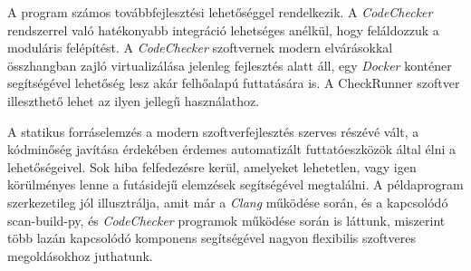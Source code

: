 \documentclass[a4paper,12pt]{report}
\begin{document}
A program számos továbbfejlesztési lehetőséggel rendelkezik. A \emph{CodeChecker} rendszerrel való hatékonyabb integráció lehetséges anélkül, hogy feláldozzuk a moduláris felépítést. A \emph{CodeChecker} szoftvernek modern elvárásokkal összhangban zajló virtualizálása jelenleg fejlesztés alatt áll, egy \emph{Docker} konténer segítségével lehetőség lesz akár felhőalapú futtatására is. A CheckRunner szoftver illeszthető lehet az ilyen jellegű használathoz.

A statikus forráselemzés a modern szoftverfejlesztés szerves részévé vált, a kódminőség javítása érdekében érdemes automatizált futtatóeszközök által élni a lehetőségeivel. Sok hiba felfedezésre kerül, amelyeket lehetetlen, vagy igen körülményes lenne a futásidejű elemzések segítségével megtalálni. A példaprogram szerkezetileg jól illusztrálja, amit már a \emph{Clang} működése során, és a kapcsolódó scan-build-py, és \emph{CodeChecker} programok működése során is láttunk, miszerint több lazán kapcsolódó komponens segítségével nagyon flexibilis szoftveres megoldásokhoz juthatunk.
\end{document}

